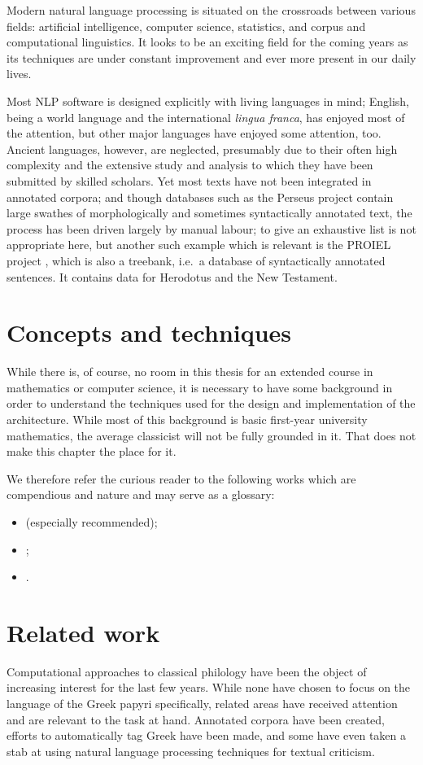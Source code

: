 Modern natural language processing is situated on the crossroads
between various fields: artificial intelligence, computer science,
statistics, and corpus and computational linguistics. It looks to be
an exciting field for the coming years as its techniques are under
constant improvement and ever more present in our daily lives.

Most NLP software is designed explicitly with living languages in
mind; English, being a world language and the international
\textit{lingua franca}, has enjoyed most of the attention, but other
major languages have enjoyed some attention, too. Ancient languages,
however, are neglected, presumably due to their often high complexity
and the extensive study and analysis to which they have been submitted
by skilled scholars. Yet most texts have not been integrated in
annotated corpora; and though databases such as the Perseus project
contain large swathes of morphologically and sometimes syntactically
annotated text, the process has been driven largely by manual labour;
to give an exhaustive list is not appropriate here, but another such
example which is relevant is the PROIEL project \citep{proiel}, which
is also a treebank, i.e.\ a database of syntactically annotated
sentences. It contains data for Herodotus and the New Testament.

\section{Concepts and techniques}
\label{sec:shortconcepts}
While there is, of course, no room in this thesis for an extended
course in mathematics or computer science, it is necessary to have
some background in order to understand the techniques used for the
design and implementation of the architecture. While most of this
background is basic first-year university mathematics, the average
classicist will not be fully grounded in it. That does not make this
chapter the place for it. 

We therefore refer the curious reader to the following works which are
compendious and nature and may serve as a glossary:
\begin{itemize}
\item \cite{russell2010artificial} (especially recommended);
\item \cite{citeulike:418876};
\item \cite{haykin1999neural}.
\end{itemize}

\section{Related work}
\label{sec:relatedwork}
Computational approaches to classical philology have been the object
of increasing interest for the last few years. While none have chosen
to focus on the language of the Greek papyri specifically, related
areas have received attention and are relevant to the task at
hand. Annotated corpora have been created, efforts to automatically
tag Greek have been made, and some have even taken a stab at using
natural language processing techniques for textual criticism. 

